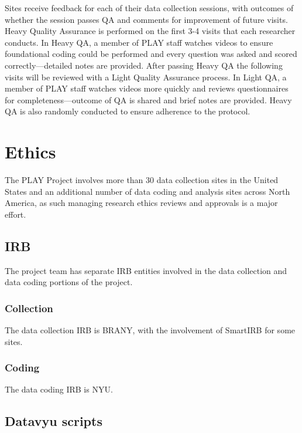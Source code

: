 \documentclass[
  12pt,
]{book}
\begin{document}
Sites receive feedback for each of their data collection sessions, with outcomes of whether the session passes QA and comments for improvement of future visits. Heavy Quality Assurance is performed on the first 3-4 visits that each researcher conducts. In Heavy QA, a member of PLAY staff watches videos to ensure foundational coding could be performed and every question was asked and scored correctly---detailed notes are provided. After passing Heavy QA the following visits will be reviewed with a Light Quality Assurance process. In Light QA, a member of PLAY staff watches videos more quickly and reviews questionnaires for completeness---outcome of QA is shared and brief notes are provided. Heavy QA is also randomly conducted to ensure adherence to the protocol.

\hypertarget{part-ethics}{%
\part{Ethics}\label{part-ethics}}

The PLAY Project involves more than 30 data collection sites in the United States and an additional number of data coding and analysis sites across North America, as such managing research ethics reviews and approvals is a major effort.

\hypertarget{irb}{%
\chapter{IRB}\label{irb}}

The project team has separate IRB entities involved in the data collection and data coding portions of the project.

\hypertarget{collection}{%
\section{Collection}\label{collection}}

The data collection IRB is BRANY, with the involvement of SmartIRB for some sites.

\hypertarget{coding}{%
\section{Coding}\label{coding}}

The data coding IRB is NYU.

\hypertarget{appendix-appendix}{%
\appendix}


\hypertarget{datavyu-scripts}{%
\chapter{Datavyu scripts}\label{datavyu-scripts}}
\end{document}
